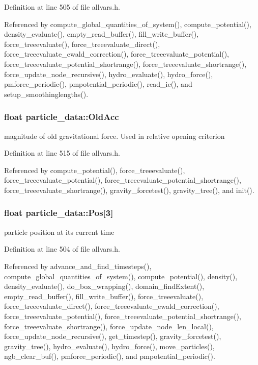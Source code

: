 Definition at line 505 of file allvars.h.



Referenced by compute\_\-global\_\-quantities\_\-of\_\-system(), compute\_\-potential(), density\_\-evaluate(), empty\_\-read\_\-buffer(), fill\_\-write\_\-buffer(), force\_\-treeevaluate(), force\_\-treeevaluate\_\-direct(), force\_\-treeevaluate\_\-ewald\_\-correction(), force\_\-treeevaluate\_\-potential(), force\_\-treeevaluate\_\-potential\_\-shortrange(), force\_\-treeevaluate\_\-shortrange(), force\_\-update\_\-node\_\-recursive(), hydro\_\-evaluate(), hydro\_\-force(), pmforce\_\-periodic(), pmpotential\_\-periodic(), read\_\-ic(), and setup\_\-smoothinglengths().

\hypertarget{structparticle__data_a5466aae28c06365368c9399c8f7cc02d}{
\subsubsection[{OldAcc}]{\setlength{\rightskip}{0pt plus 5cm}float {\bf particle\_\-data::OldAcc}}}
\label{structparticle__data_a5466aae28c06365368c9399c8f7cc02d}
magnitude of old gravitational force. Used in relative opening criterion 

Definition at line 515 of file allvars.h.



Referenced by compute\_\-potential(), force\_\-treeevaluate(), force\_\-treeevaluate\_\-potential(), force\_\-treeevaluate\_\-potential\_\-shortrange(), force\_\-treeevaluate\_\-shortrange(), gravity\_\-forcetest(), gravity\_\-tree(), and init().

\hypertarget{structparticle__data_a764ffe35d82a64065f585e3a84263dd1}{
\subsubsection[{Pos}]{\setlength{\rightskip}{0pt plus 5cm}float {\bf particle\_\-data::Pos}\mbox{[}3\mbox{]}}}
\label{structparticle__data_a764ffe35d82a64065f585e3a84263dd1}
particle position at its current time 

Definition at line 504 of file allvars.h.



Referenced by advance\_\-and\_\-find\_\-timesteps(), compute\_\-global\_\-quantities\_\-of\_\-system(), compute\_\-potential(), density(), density\_\-evaluate(), do\_\-box\_\-wrapping(), domain\_\-findExtent(), empty\_\-read\_\-buffer(), fill\_\-write\_\-buffer(), force\_\-treeevaluate(), force\_\-treeevaluate\_\-direct(), force\_\-treeevaluate\_\-ewald\_\-correction(), force\_\-treeevaluate\_\-potential(), force\_\-treeevaluate\_\-potential\_\-shortrange(), force\_\-treeevaluate\_\-shortrange(), force\_\-update\_\-node\_\-len\_\-local(), force\_\-update\_\-node\_\-recursive(), get\_\-timestep(), gravity\_\-forcetest(), gravity\_\-tree(), hydro\_\-evaluate(), hydro\_\-force(), move\_\-particles(), ngb\_\-clear\_\-buf(), pmforce\_\-periodic(), and pmpotential\_\-periodic().

